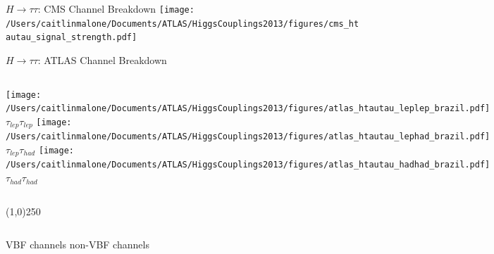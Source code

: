 \documentclass{beamer}
\begin{document}
\begin{frame}{$H\rightarrow \tau \tau$: CMS Channel Breakdown}
	\texttt{[image: /Users/caitlinmalone/Documents/ATLAS/HiggsCouplings2013/figures/cms\_htautau\_signal\_strength.pdf]}
\end{frame}



\begin{frame}{$H\rightarrow\tau\tau$: ATLAS Channel Breakdown}
	\begin{columns}[c]
			\texttt{[image: /Users/caitlinmalone/Documents/ATLAS/HiggsCouplings2013/figures/atlas\_htautau\_leplep\_brazil.pdf]}\\
			\scriptsize\center \vspace{-0.5cm}
			$\tau_{lep}\tau_{lep}$
			\texttt{[image: /Users/caitlinmalone/Documents/ATLAS/HiggsCouplings2013/figures/atlas\_htautau\_lephad\_brazil.pdf]} 
			\scriptsize\center \vspace{-0.5cm}
			$\tau_{lep}\tau_{had}$
			\texttt{[image: /Users/caitlinmalone/Documents/ATLAS/HiggsCouplings2013/figures/atlas\_htautau\_hadhad\_brazil.pdf]} 
			\scriptsize \center \vspace{-0.5cm}
			$\tau_{had}\tau_{had}$
	\end{columns}
	
	\begin{center}
	\line(1,0){250}
	\end{center}
	
	\begin{columns}[c]
			\scriptsize \center \vspace{-0.5cm}
			VBF channels
			\scriptsize \center \vspace{-0.5cm}
			non-VBF channels
	\end{columns}

\end{frame}
\end{document}
